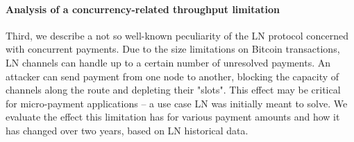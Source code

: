 \paragraph{Analysis of a concurrency-related throughput limitation}
Third, we describe a not so well-known peculiarity of the LN protocol concerned with concurrent payments.
Due to the size limitations on Bitcoin transactions, LN channels can handle up to a certain number of unresolved payments.
An attacker can send payment from one node to another, blocking the capacity of channels along the route and depleting their "slots".
This effect may be critical for micro-payment applications -- a use case LN was initially meant to solve.
We evaluate the effect this limitation has for various payment amounts and how it has changed over two years, based on LN historical data.


